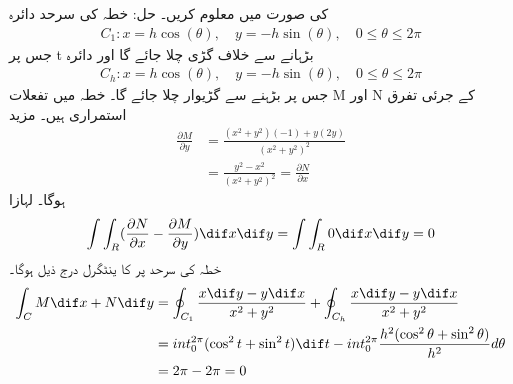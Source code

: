   کی صورت میں معلوم کریں۔  حل: خطہ   کی سرحد دائرہ 
\begin{align*}
 C_1 : x=h\cos{(\theta)},\quad  y= -h\sin{(\theta)},\quad 0\leq \theta \leq 2\pi 
\end{align*}
  جس پر t  بڑہانے سے خلاف گڑی چلا جائے گا اور دائرہ 
\begin{align*}
  C_h : x=h\cos{(\theta)},\quad  y= -h\sin{(\theta)},\quad 0\leq \theta \leq 2\pi  
\end{align*}
  جس پر   بڑہنے سے گڑیوار چلا جائے گا۔ خطہ  میں تفعلات M اور N کے جرئی تفرق استمراری ہیں۔ مزید 
\begin{align*}
     \frac{\partial M}{\partial y} &= \frac{(x^2 + y^2)(-1) + y(2y)}{(x^2 + y^2)^2} \\     &= \frac{y^2 - x^2}{(x^2 + y^2)^2} = \frac{\partial N}{\partial x} 
\end{align*}
 ہوگا۔ لہازا 
\begin{align*}
     \int \int_R (\frac{\partial N}{\partial x} - \frac{\partial M}{\partial y}) \dif x \dif y = \int \int_R 0 \dif x \dif y =0  
\end{align*}
 خطہ  کی سرحد پر   کا ینٹگرل درج ذیل ہوگا۔ 
\begin{align*}
 \int_C M \dif x + N \dif y &= \oint_{C_1} \frac{x \dif y - y \dif x}{x^2 + y^2} + \oint_{C_h}  \frac{x \dif y - y \dif x}{x^2 + y^2} \\ &= int_0^{2\pi} (\cos^2{t} + \sin^2{t}) \dif t - int_0^{2\pi} \frac{h^2 (\cos^2{\theta} + \sin^2{\theta})}{h^2} d\theta\\ &= 2\pi - 2\pi =0  
\end{align*}
 

